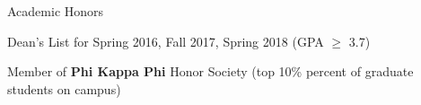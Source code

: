 \begin{rSection}{Academic Honors}
    \begin{rSubsection}{}{}{}{}
        \item Dean's List for Spring 2016, Fall 2017, Spring 2018 (GPA $\geq$ 3.7)
        \item Member of \textbf{Phi Kappa Phi} Honor Society (top 10\% percent of graduate students on campus)
    \end{rSubsection}
\end{rSection}
